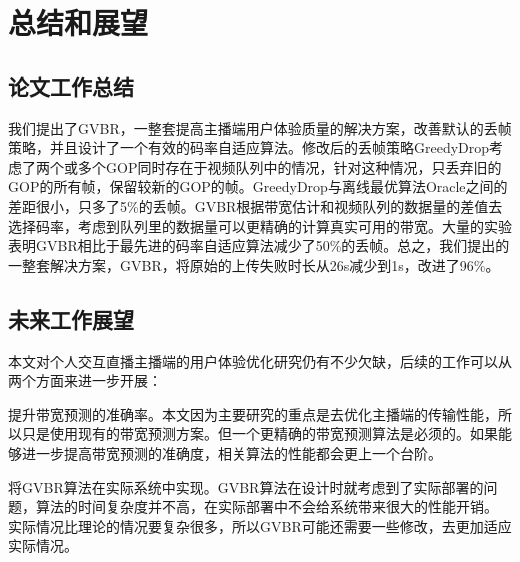 \chapter{总结和展望}
\section{论文工作总结}
我们提出了GVBR，一整套提高主播端用户体验质量的解决方案，改善默认的丢帧策略，并且设计了一个有效的码率自适应算法。修改后的丢帧策略GreedyDrop考虑了两个或多个GOP同时存在于视频队列中的情况，针对这种情况，只丢弃旧的GOP的所有帧，保留较新的GOP的帧。GreedyDrop与离线最优算法Oracle之间的差距很小，只多了5\%的丢帧。GVBR根据带宽估计和视频队列的数据量的差值去选择码率，考虑到队列里的数据量可以更精确的计算真实可用的带宽。大量的实验表明GVBR相比于最先进的码率自适应算法减少了50\%的丢帧。总之，我们提出的一整套解决方案，GVBR，将原始的上传失败时长从26s减少到1s，改进了96\%。

\section{未来工作展望}
本文对个人交互直播主播端的用户体验优化研究仍有不少欠缺，后续的工作可以从两个方面来进一步开展：

提升带宽预测的准确率。本文因为主要研究的重点是去优化主播端的传输性能，所以只是使用现有的带宽预测方案。但一个更精确的带宽预测算法是必须的。如果能够进一步提高带宽预测的准确度，相关算法的性能都会更上一个台阶。

将GVBR算法在实际系统中实现。GVBR算法在设计时就考虑到了实际部署的问题，算法的时间复杂度并不高，在实际部署中不会给系统带来很大的性能开销。 实际情况比理论的情况要复杂很多，所以GVBR可能还需要一些修改，去更加适应实际情况。